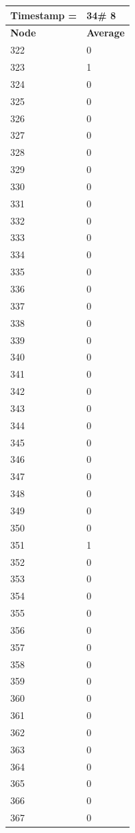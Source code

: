 \begin{tabular}{|l||l|}
\hline
\textbf{Timestamp =} & \textbf{34}\# 8\\\hline
	\textbf{Node} & \textbf{Average} \\ \hline
\hline
	322 & 0 \\ \hline
	323 & 1 \\ \hline
	324 & 0 \\ \hline
	325 & 0 \\ \hline
	326 & 0 \\ \hline
	327 & 0 \\ \hline
	328 & 0 \\ \hline
	329 & 0 \\ \hline
	330 & 0 \\ \hline
	331 & 0 \\ \hline
	332 & 0 \\ \hline
	333 & 0 \\ \hline
	334 & 0 \\ \hline
	335 & 0 \\ \hline
	336 & 0 \\ \hline
	337 & 0 \\ \hline
	338 & 0 \\ \hline
	339 & 0 \\ \hline
	340 & 0 \\ \hline
	341 & 0 \\ \hline
	342 & 0 \\ \hline
	343 & 0 \\ \hline
	344 & 0 \\ \hline
	345 & 0 \\ \hline
	346 & 0 \\ \hline
	347 & 0 \\ \hline
	348 & 0 \\ \hline
	349 & 0 \\ \hline
	350 & 0 \\ \hline
	351 & 1 \\ \hline
	352 & 0 \\ \hline
	353 & 0 \\ \hline
	354 & 0 \\ \hline
	355 & 0 \\ \hline
	356 & 0 \\ \hline
	357 & 0 \\ \hline
	358 & 0 \\ \hline
	359 & 0 \\ \hline
	360 & 0 \\ \hline
	361 & 0 \\ \hline
	362 & 0 \\ \hline
	363 & 0 \\ \hline
	364 & 0 \\ \hline
	365 & 0 \\ \hline
	366 & 0 \\ \hline
	367 & 0 \\ \hline
\end{tabular}
